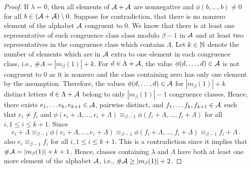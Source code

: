 \begin{proof}

If $\lambda=0$, then all elements of $\mathcal{A}+\mathcal{A}$ are nonnegative and $\phi(b,\dots,b)\neq 0$ for all $b\in(\mathcal{A}+\mathcal{A})\setminus 0$. Suppose for contradiction, that there is no nonzero element of the alphabet $\mathcal{A}$ congruent to 0. We know that there is at least one representative of each congruence class class modulo $\beta-1$ in $\mathcal{A}$ and at least two representatives in the congruence class which contains $\Lambda$. Let $k\in\mathbb{N}$ denote the number of elements which are in $\mathcal{A}$ extra to one element in each congruence class, i.e., $\#A=|m_\beta(1)|+k$.  For $d\in\Lambda+\mathcal{A}$, the value $\phi(d,\dots,d)\in\mathcal{A}$ is not congruent to 0 as it is nonzero and the class containing zero has only one element by the assumption. Therefore, the values  $\phi(d,\dots,d)\in\mathcal{A}$ for $|m_\beta(1)|+k$ distinct letters $d\in\Lambda+\mathcal{A}$ belong to only $|m_\beta(1)|-1$ congruence classes. Hence, there exists $e_1,\dots e_k, e_{k+1}\in\mathcal{A}$, pairwise distinct, and $f_1,\dots f_k, f_{k+1}\in\mathcal{A}$ such that $e_i\neq f_i$ and $\phi(e_i+\Lambda,\dots, e_i+\Lambda)\equiv_{\beta-1}\phi(f_i+\Lambda,\dots, f_i+\Lambda)$ for all $i, 1\leq i\leq k+1$. Since 
$$
e_i+\Lambda\equiv_{\beta-1}\phi(e_i+\Lambda,\dots, e_i+\Lambda)\equiv_{\beta-1}\phi(f_i+\Lambda,\dots, f_i+\Lambda)\equiv_{\beta-1}f_i+\Lambda\,.
$$ 
also $e_i\equiv_{\beta-1}f_i$ for all $i, 1\leq i\leq k+1$. This is a contradiction since it implies that $\#\mathcal{A}=|m_\beta(1)|+k+1$. Hence, classes containing $\lambda$ and $\Lambda$ have both at least one more  element of the alphabet $\mathcal{A}$, i.e., $\#\mathcal{A}\geq |m_\beta(1)|+2$. 
\end{proof}

